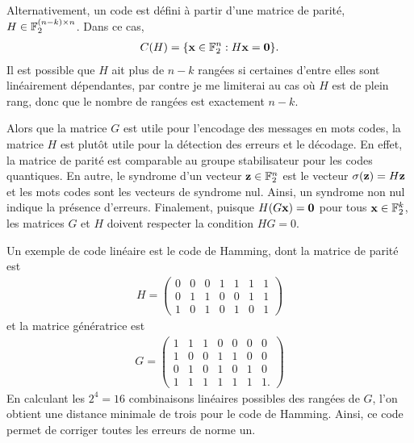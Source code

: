 Alternativement,
un code est défini à partir d'une matrice de parité, $H \in \mathbb{F}_{2}^{(n - k) \times n}$.
Dans ce cas,
\begin{align}
	C(H) = \qty{
		\vb x \in \mathbb{F}_{2}^n : H \vb x = \vb 0
	}.
\end{align}
Il est possible que $H$ ait plus de $n - k$ rangées si certaines d'entre elles 
sont linéairement dépendantes, par contre je me limiterai au cas où $H$ est 
de plein rang, donc que le nombre de rangées est exactement $n - k$.

Alors que la matrice $G$ est utile pour l'encodage des messages en mots codes,
la matrice $H$ est plutôt utile pour la détection des erreurs et le décodage.
En effet,
la matrice de parité est comparable au groupe stabilisateur pour les codes quantiques.
En autre,
le syndrome d'un vecteur $\vb z \in \mathbb{F}_{2}^n$ est le vecteur $\sigma(\vb z) = H\vb z$
et les mots codes sont les vecteurs de syndrome nul.
Ainsi, un syndrome non nul indique la présence d'erreurs.
Finalement, puisque $H (G\vb x) = \vb 0$ pour tous $\vb x \in \mathbb{F}_{2}^k$,
les matrices $G$ et $H$ doivent respecter la condition $HG = 0$.

Un exemple de code linéaire est le code de Hamming, dont la matrice
de parité est 
\begin{align}
	H = \begin{pmatrix}
		0 & 0 & 0 & 1 & 1 & 1 & 1 \\
		0 & 1 & 1 & 0 & 0 & 1 & 1 \\
		1 & 0 & 1 & 0 & 1 & 0 & 1
	\end{pmatrix}
\end{align}
et la matrice génératrice est 
\begin{align}
	G = \begin{pmatrix}
		1 & 1 & 1 & 0 & 0 & 0 & 0 \\
		1 & 0 & 0 & 1 & 1 & 0 & 0 \\
		0 & 1 & 0 & 1 & 0 & 1 & 0 \\
		1 & 1 & 1 & 1 & 1 & 1 & 1.
	\end{pmatrix}
\end{align}
En calculant les $2^4 = 16$ combinaisons linéaires possibles des 
rangées de $G$,
l'on obtient une distance minimale de trois pour le code de Hamming.
Ainsi,
ce code permet de corriger toutes les erreurs de norme un.

